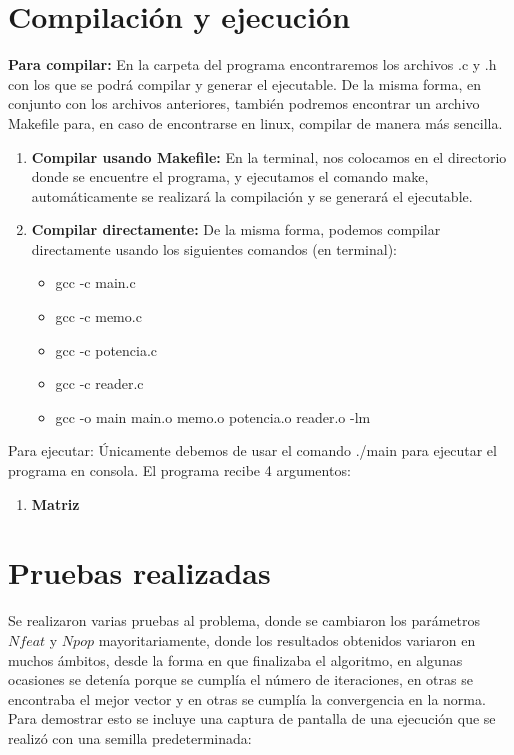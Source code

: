 \documentclass[12pt]{article}
\begin{document}
\section{Compilación y ejecución}
\textbf{Para compilar:} En la carpeta del programa encontraremos los archivos .c y .h con los que se podrá compilar y generar el ejecutable. De la misma forma, en conjunto con los archivos anteriores, también podremos encontrar un archivo Makefile para, en caso de encontrarse en linux, compilar de manera más sencilla.\\

\begin{enumerate}
	\item \textbf{Compilar usando Makefile:} En la terminal, nos colocamos en el directorio donde se encuentre el programa, y ejecutamos el comando make, automáticamente se realizará la compilación y se generará el ejecutable.\\
	\item \textbf{Compilar directamente:} De la misma forma, podemos compilar directamente usando los siguientes comandos (en terminal):\\
	
	\begin{itemize}
		\item gcc -c main.c
		\item gcc -c memo.c
		\item gcc -c potencia.c
		\item gcc -c reader.c
		\item gcc -o main main.o memo.o potencia.o reader.o -lm
	\end{itemize}
\end{enumerate}

Para ejecutar: Únicamente debemos de usar el comando ./main para ejecutar el programa en consola. El programa recibe 4 argumentos:\\

\begin{enumerate}
	\item \textbf{Matriz}
\end{enumerate}

\section{Pruebas realizadas}
Se realizaron varias pruebas al problema, donde se cambiaron los parámetros $Nfeat$ y $Npop$ mayoritariamente, donde los resultados obtenidos variaron en muchos ámbitos, desde la forma en que finalizaba el algoritmo, en algunas ocasiones se detenía porque se cumplía el número de iteraciones, en otras se encontraba el mejor vector y en otras se cumplía la convergencia en la norma. Para demostrar esto se incluye una captura de pantalla de una ejecución que se realizó con una semilla predeterminada:\\
\end{document}

